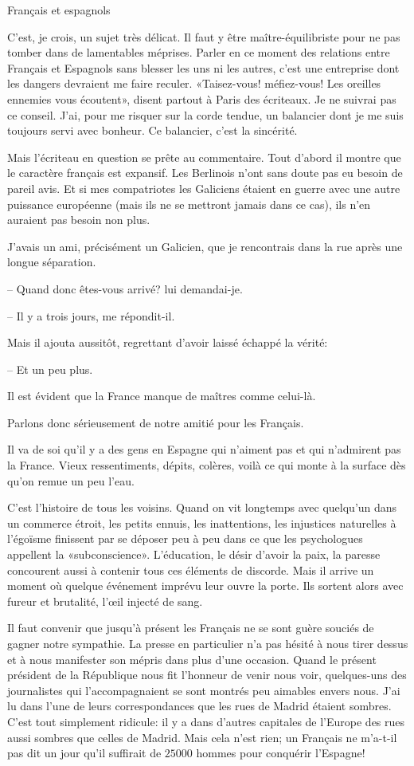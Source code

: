 \begin{chapter}{Français et espagnols}

C'est, je crois, un sujet très délicat. Il faut y être
maître-équilibriste pour ne pas tomber dans de lamentables méprises.
Parler en ce moment des relations entre Français et Espagnols sans
blesser les uns ni les autres, c'est une entreprise dont les dangers
devraient me faire reculer. «Taisez-vous! méfiez-vous! Les oreilles
ennemies vous écoutent», disent partout à Paris des écriteaux. Je ne
suivrai pas ce conseil. J'ai, pour me risquer sur la corde tendue, un
balancier dont je me suis toujours servi avec bonheur. Ce balancier,
c'est la sincérité.

Mais l'écriteau en question se prête au commentaire. Tout d'abord il
montre que le caractère français est expansif. Les Berlinois n'ont sans
doute pas eu besoin de pareil avis. Et si mes compatriotes les Galiciens
étaient en guerre avec une autre puissance européenne (mais ils ne se
mettront jamais dans ce cas), ils n'en auraient pas besoin non plus.

J'avais un ami, précisément un Galicien, que je rencontrais dans la rue
après une longue séparation.

-- Quand donc êtes-vous arrivé? lui demandai-je.

-- Il y a trois jours, me répondit-il.

Mais il ajouta aussitôt, regrettant d'avoir laissé échappé la vérité:

-- Et un peu plus.

Il est évident que la France manque de maîtres comme celui-là.

Parlons donc sérieusement de notre amitié pour les Français.

Il va de soi qu'il y a des gens en Espagne qui n'aiment pas et qui
n'admirent pas la France. Vieux ressentiments, dépits, colères, voilà ce
qui monte à la surface dès qu'on remue un peu l'eau.

C'est l'histoire de tous les voisins. Quand on vit longtemps avec
quelqu'un dans un commerce étroit, les petits ennuis, les inattentions,
les injustices naturelles à l'égoïsme finissent par se déposer peu à peu
dans ce que les psychologues appellent la «subconscience». L'éducation,
le désir d'avoir la paix, la paresse concourent aussi à contenir tous
ces éléments de discorde. Mais il arrive un moment où quelque événement
imprévu leur ouvre la porte. Ils sortent alors avec fureur et brutalité,
l'œil injecté de sang.

Il faut convenir que jusqu'à présent les Français ne se sont guère
souciés de gagner notre sympathie. La presse en particulier n'a pas
hésité à nous tirer dessus et à nous manifester son mépris dans plus
d'une occasion. Quand le présent président de la République nous fit
l'honneur de venir nous voir, quelques-uns des journalistes qui
l'accompagnaient se sont montrés peu aimables envers nous. J'ai lu dans
l'une de leurs correspondances que les rues de Madrid étaient sombres.
C'est tout simplement ridicule: il y a dans d'autres capitales de
l'Europe des rues aussi sombres que celles de Madrid. Mais cela n'est
rien; un Français ne m'a-t-il pas dit un jour qu'il suffirait de $25000$
hommes pour conquérir l'Espagne!


\end{chapter}
